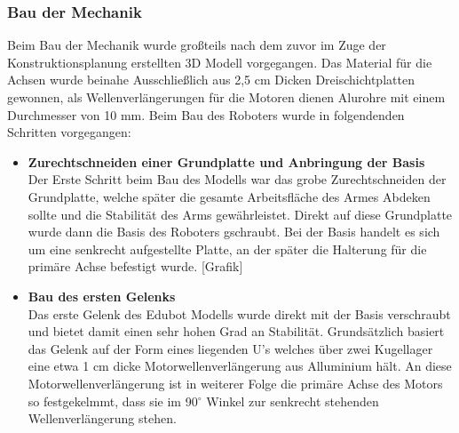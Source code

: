 \subsubsection{Bau der Mechanik}
Beim Bau der Mechanik wurde großteils nach dem zuvor im Zuge der Konstruktionsplanung erstellten 3D Modell vorgegangen. Das Material für die Achsen wurde beinahe Ausschließlich aus 2,5 cm Dicken Dreischichtplatten gewonnen, als Wellenverlängerungen für die Motoren dienen Alurohre mit einem Durchmesser von 10 mm. 
Beim Bau des Roboters wurde in folgendenden Schritten vorgegangen:
\begin{itemize}
\item \textbf{Zurechtschneiden einer Grundplatte und Anbringung der Basis}\\
Der Erste Schritt beim Bau des Modells war das grobe Zurechtschneiden der Grundplatte, welche später die gesamte Arbeitsfläche des Armes Abdeken sollte und die Stabilität des Arms gewährleistet.
Direkt auf diese Grundplatte wurde dann die Basis des Roboters gschraubt. Bei der Basis handelt es sich um eine senkrecht aufgestellte Platte, an der später die Halterung für die primäre Achse befestigt wurde.
[Grafik]
\item \textbf{Bau des ersten Gelenks}\\
Das erste Gelenk des  Edubot Modells wurde direkt mit der Basis verschraubt und bietet damit einen sehr hohen Grad an Stabilität. Grundsätzlich basiert das Gelenk auf der Form eines liegenden U's welches über zwei Kugellager eine etwa 1 cm dicke Motorwellenverlängerung aus Alluminium hält. An diese Motorwellenverlängerung ist in weiterer Folge die primäre Achse des Motors so festgekelmmt, dass sie im 90$^\circ$ Winkel zur senkrecht stehenden Wellenverlängerung stehen.


\end{itemize}
